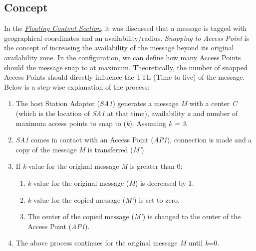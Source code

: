 \subsection{Concept}
In the \hyperref[section:floating-content]{\emph{Floating Content Section}}, it was discussed that a message is tagged with geographical coordinates and an availability/radius. \textit{Snapping to Access Point} is the concept of increasing the availability of the message beyond its original availability zone. In the configuration, we can define how many Access Points should the message snap to at maximum. Theoretically, the number of snapped Access Points should directly influence the TTL (Time to live) of the message. Below is a step-wise explanation of the process:

	\begin{enumerate}
 	 \item The host Station Adapter (\textit{SA1}) generates a message \textit{M} with a center \textit{C} (which is the location of \textit{SA1} at that time), availability \textit{a} and number of maximum access points to snap to (\textit{k}). Assuming \textit{k = 3}.
 	 \item \textit{SA1} comes in contact with an Access Point (\textit{AP1}), connection is made and a copy of the message \textit{M} is transferred (\textit{M'}).
 	 \item If \textit{k}-value for the original message \textit{M} is greater than 0:
 	 	\begin{enumerate}
 	 		\item \textit{k}-value for the original message (\textit{M}) is decreased by 1.
 	 		\item \textit{k}-value for the copied message (\textit{M'}) is set to zero.
 	 		\item The center of the copied message (\textit{M'}) is changed to the center of the Access Point (\textit{AP1}).
 	 	\end{enumerate}
 	 \item The above process continues for the original message \textit{M} until \textit{k}=0.
 	 \end{enumerate}

